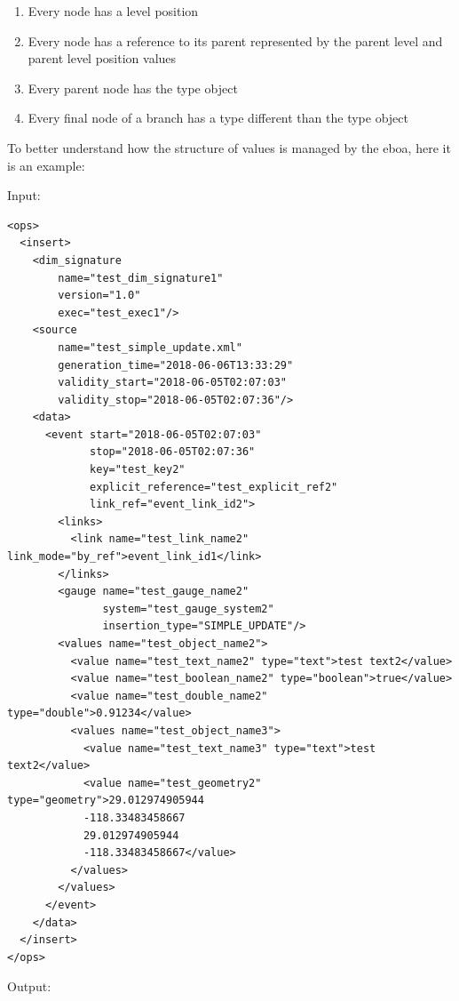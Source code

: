 \begin{enumerate}

\item Every node has a level position
\item Every node has a reference to its parent represented by the parent level and parent level position values
\item Every parent node has the type object
\item Every final node of a branch has a type different than the type object

\end{enumerate}

To better understand how the structure of values is managed by the \acrshort{eboa}, here it is an example:

Input:
\begin{lstlisting}[style=xml, caption={XML input example for showing the values structure management.}]
<ops>
  <insert>
    <dim_signature
        name="test_dim_signature1"
        version="1.0"
        exec="test_exec1"/>
    <source
        name="test_simple_update.xml" 
        generation_time="2018-06-06T13:33:29"
        validity_start="2018-06-05T02:07:03"
        validity_stop="2018-06-05T02:07:36"/>
    <data>
      <event start="2018-06-05T02:07:03"
             stop="2018-06-05T02:07:36"
             key="test_key2"
             explicit_reference="test_explicit_ref2"
             link_ref="event_link_id2">
        <links>
          <link name="test_link_name2" link_mode="by_ref">event_link_id1</link>
        </links>
        <gauge name="test_gauge_name2"
               system="test_gauge_system2"
               insertion_type="SIMPLE_UPDATE"/>
        <values name="test_object_name2">
          <value name="test_text_name2" type="text">test text2</value>
          <value name="test_boolean_name2" type="boolean">true</value>
          <value name="test_double_name2" type="double">0.91234</value>
          <values name="test_object_name3">
            <value name="test_text_name3" type="text">test text2</value>
            <value name="test_geometry2" type="geometry">29.012974905944
            -118.33483458667
            29.012974905944
            -118.33483458667</value>
          </values>
        </values>
      </event>
    </data>
  </insert>
</ops>
\end{lstlisting}

Output:

